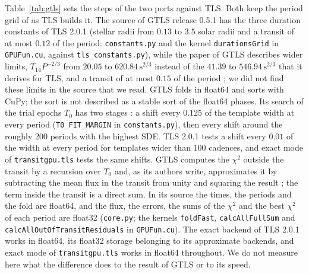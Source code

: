 \documentclass{aastex631}
\begin{document}
Table~\ref{tab:gtls} sets the steps of the two ports against TLS. Both keep the period grid of \citet{Ofir2014} as TLS builds it. The source of GTLS release 0.5.1 has the three duration constants of TLS 2.0.1 (stellar radii from $0.13$ to $3.5$ solar radii and a transit of at most $0.12$ of the period: \texttt{constants.py} and the kernel \texttt{durationsGrid} in \texttt{GPUFun.cu}, against \texttt{tls\_constants.py}), while the paper of GTLS describes wider limits, $T_{14}P^{-2/3}$ from $20.05$ to $620.84\,\mathrm{s}^{2/3}$ instead of the $41.39$ to $546.94\,\mathrm{s}^{2/3}$ that it derives for TLS, and a transit of at most $0.15$ of the period \citep[Sect.~2.2.2]{Hu2026}; we did not find these limits in the source that we read. GTLS folds in float64 and sorts with CuPy; the sort is not described as a stable sort of the float64 phases. Its search of the trial epochs $T_0$ has two stages \citep[Sect.~2.5]{Hu2026}: a shift every $0.125$ of the template width at every period (\texttt{T0\_FIT\_MARGIN} in \texttt{constants.py}), then every shift around the roughly 200 periods with the highest SDE. TLS 2.0.1 tests a shift every $0.01$ of the width at every period for templates wider than 100 cadences, and exact mode of \texttt{transitgpu.tls} tests the same shifts. GTLS computes the $\chi^2$ outside the transit by a recursion over $T_0$ and, as its authors write, approximates it by subtracting the mean flux in the transit from unity and squaring the result \citep[Sect.~2.3.4]{Hu2026}; the term inside the transit is a direct sum. In its source the times, the periods and the fold are float64, and the flux, the errors, the sums of the $\chi^2$ and the best $\chi^2$ of each period are float32 (\texttt{core.py}; the kernels \texttt{foldFast}, \texttt{calcAllFullSum} and \texttt{calcAllOutOfTransitResiduals} in \texttt{GPUFun.cu}). The exact backend of TLS 2.0.1 works in float64, its float32 storage belonging to its approximate backends, and exact mode of \texttt{transitgpu.tls} works in float64 throughout. We do not measure here what the difference does to the result of GTLS or to its speed.
\end{document}
